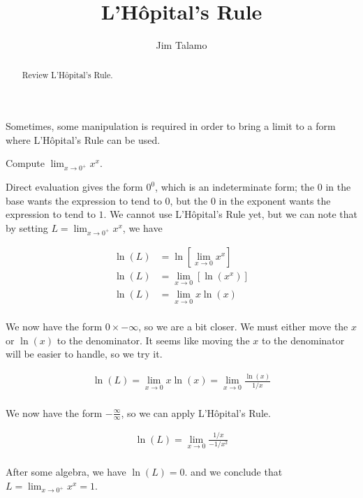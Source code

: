 \documentclass{ximera}
\author{Jim Talamo}
\title[Refresh:]{ L'H\^{o}pital's Rule}
\begin{document}
\begin{abstract}
Review  L'H\^{o}pital's Rule.
\end{abstract}
\maketitle

\begin{problem}
Sometimes, some manipulation is required in order to bring a limit to a form where L'H\^{o}pital's Rule can be used.  

\begin{example}
Compute $\lim_{x \to 0^+} x^x$.

\begin{explanation}
Direct evaluation gives the form $0^0$, which is an indeterminate form; the $0$ in the base wants the expression to tend to $0$, but the $0$ in the exponent wants the expression to tend to $1$.  We cannot use L'H\^{o}pital's Rule yet, but we can note that by setting $L = \lim_{x \to 0^+} x^x$, we have

\begin{align*}
\ln(L)  &= \ln\left[ \lim_{x \to 0} x^x\right] \\
\ln(L)  &=   \lim_{x \to 0} \left[ \ln(x^x) \right] \\
\ln(L)  &=   \lim_{x \to 0} x \ln(x)  \\
\end{align*} 

We now have the form $0 \times -\infty$, so we are a bit closer.  We must either move the $x$ or $\ln(x)$ to the denominator.  It seems like moving the $x$ to the denominator will be easier to handle, so we try it.


\begin{align*}
\ln(L)  =   \lim_{x \to 0} x \ln(x)  = \lim_{x \to 0} \frac{ \ln(x)}{1/x}  \\
\end{align*} 

We now have the form $-\frac{\infty}{\infty}$, so we can apply L'H\^{o}pital's Rule.

\begin{align*}
\ln(L)  =  \lim_{x \to 0} \frac{1/x}{-1/x^2}  \\
\end{align*} 

After some algebra, we have $\ln(L) = 0$. and we conclude that $L = \lim_{x \to 0^+} x^x = 1$.
\end{explanation}
\end{example}


\end{problem}
\end{document}
